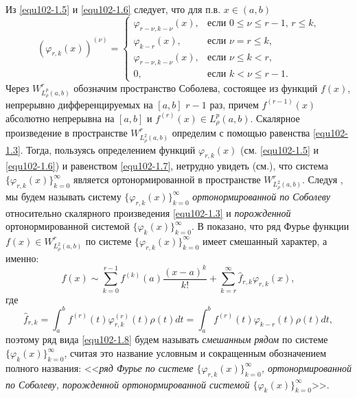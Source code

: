  Из \eqref{equ102-1.5} и \eqref{equ102-1.6} следует, что для п.в. $x\in (a,b)$
 \begin{equation}\label{equ102-1.7}
(\varphi_{r,k}(x))^{(\nu)} =\begin{cases}\varphi_{r-\nu,k-\nu}(x),&\text{если $0\le\nu\le r-1$, $r\le k$,}\\
\varphi_{k-r}(x),&\text{если  $\nu=r\le k$,}\\
\varphi_{r-\nu,k-\nu}(x),&\text{если $\nu\le k< r$,}\\
0,&\text{если $k< \nu\le r-1$}.
  \end{cases}
\end{equation}
Через $W^r_{L^p_\rho(a,b)}$ обозначим пространство Соболева, состоящее из функций $f(x)$, непрерывно дифференцируемых на $[a,b]$ $r-1$ раз, причем $f^{(r-1)}(x)$ абсолютно непрерывна на $[a,b]$  и $f^{(r)}(x)\in L^p_\rho(a,b)$.
Скалярное произведение в пространстве $W^r_{L^2_\rho(a,b)}$ определим с помощью равенства \eqref{equ102-1.3}. Тогда, пользуясь определением функций  $\varphi_{r,k}(x)$ (см. \eqref{equ102-1.5} и \eqref{equ102-1.6}) и равенством  \eqref{equ102-1.7}, нетрудно увидеть (см.\cite{Shar20}),  что система $\{\varphi_{r,k}(x)\}_{k=0}^\infty$ является ортонормированной в пространстве $W^r_{L^2_\rho(a,b)}$. Следуя \cite{Shar20}, мы будем называть систему $\{\varphi_{r,k}(x)\}_{k=0}^\infty$ \textit{ ортонормированной по Соболеву } относительно скалярного произведения \eqref{equ102-1.3} и  \textit{ порожденной} ортонормированной системой $\{\varphi_{k}(x)\}_{k=0}^\infty$.
В \cite{Shar20} показано,  что ряд Фурье функции $f(x)\in W^r_{L^2_\rho(a,b)}$ по системе  $\{\varphi_{r,k}(x)\}_{k=0}^\infty$ имеет смешанный характер, а именно:
  \begin{equation}\label{equ102-1.8}
f(x)\sim \sum_{k=0}^{r-1} f^{(k)}(a)\frac{(x-a)^k}{k!}+ \sum_{k=r}^\infty \hat f_{r,k}\varphi_{r,k}(x),
\end{equation}
где
  \begin{equation}\label{equ102-1.9}
 \hat f_{r,k}=\int_a^b f^{(r)}(t) \varphi^{(r)}_{r,k}(t)\rho(t)dt=\int_a^b f^{(r)}(t) \varphi_{k-r}(t)\rho(t)dt,
\end{equation}
поэтому ряд  вида \eqref{equ102-1.8} будем  называть \textit{смешанным рядом} по  системе $\{\varphi_{k}(x)\}_{k=0}^\infty$, считая это название условным и сокращенным обозначением полного названия: <<\textit{ряд Фурье по системе  $\{\varphi_{r,k}(x)\}_{k=0}^\infty$, ортонормированной по Соболеву, порожденной ортонормированной системой $\{\varphi_{k}(x)\}_{k=0}^\infty$}>>.





